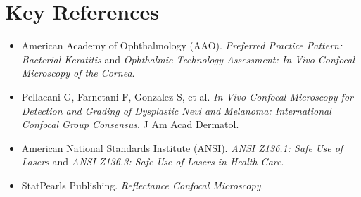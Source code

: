 \section{Key References}
\begin{itemize}
    \item American Academy of Ophthalmology (AAO). \textit{Preferred Practice Pattern: Bacterial Keratitis} and \textit{Ophthalmic Technology Assessment: In Vivo Confocal Microscopy of the Cornea}.
    \item Pellacani G, Farnetani F, Gonzalez S, et al. \textit{In Vivo Confocal Microscopy for Detection and Grading of Dysplastic Nevi and Melanoma: International Confocal Group Consensus}. J Am Acad Dermatol.
    \item American National Standards Institute (ANSI). \textit{ANSI Z136.1: Safe Use of Lasers} and \textit{ANSI Z136.3: Safe Use of Lasers in Health Care}.
    \item StatPearls Publishing. \textit{Reflectance Confocal Microscopy}.
\end{itemize}
